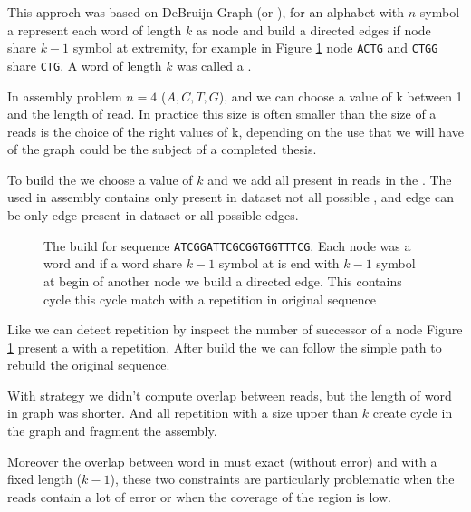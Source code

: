 \documentclass[main.tex]{subfiles}
\begin{document}
This approch was based on DeBruijn Graph (or \DBG), for an alphabet with $n$ symbol a \DBG represent each word of length $k$ as node and build a directed edges if node share $k - 1$ symbol at extremity, for example in Figure \ref{intro:fig:dbg:graph} node \texttt{ACTG} and \texttt{CTGG} share \texttt{CTG}. A word of length $k$ was called a \kmer.

In assembly problem $n = 4$ (${A, C, T, G}$), and we can choose a value of k between 1 and the length of read. In practice this size is often smaller than the size of a reads is the choice of the right values of k, depending on the use that we will have of the \DBG graph could be the subject of a completed thesis.

To build the \DBG we choose a value of $k$ and we add all \kmer present in reads in the \DBG. The \DBG used in assembly contains only \kmer present in dataset not all possible \kmer, and edge can be only edge present in dataset or all possible edges.

\begin{figure}[ht]
    \centering
    
    \caption{The \DBG build for sequence \texttt{ATCGGATTCGCGGTGGTTTCG}. Each node was a word and if a word share $k - 1$ symbol at is end with $k - 1$ symbol at begin of another node we build a directed edge. This \DBG contains cycle this cycle match with a repetition in original sequence}
    \label{intro:fig:dbg:graph}
\end{figure}

Like \OLC we can detect repetition by inspect the number of successor of a node Figure \ref{intro:fig:dbg:graph} present a \DBG with a repetition. After build the \DBG we can follow the simple path to rebuild the original sequence.

With \DBG strategy we didn't compute overlap between reads, but the length of word in graph was shorter. And all repetition with a size upper than $k$ create cycle in the graph and fragment the assembly.

Moreover the overlap between word in \DBG must exact (without error) and with a fixed length ($k - 1$), these two constraints are particularly problematic when the reads contain a lot of error or when the coverage of the region is low. 

\end{document}
